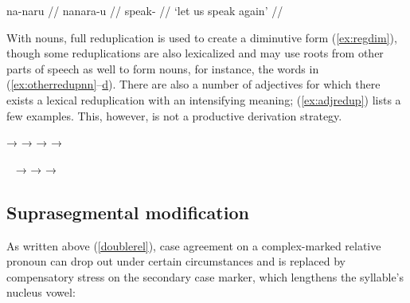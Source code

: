 \a\label{ex:hort+iter}\begingl
	\gla na-naru //
	\glb na\til{}nara-u //
	\glc \Iter{}\til{}speak-\Imp{} //
	\glft `let us speak again' //
\endgl

\xe

With nouns, full reduplication is used to create a diminutive 
form (\ref{ex:regdim}), though some reduplications are also lexicalized and 
may use roots from other parts of speech as well to form nouns, for instance, 
the words in (\ref{ex:otherredupnn}--\hyperref[ex:otherredupvb]{d}). There are 
also a number of adjectives for which there exists a lexical reduplication with 
an intensifying meaning; (\ref{ex:adjredup}) lists a few examples. This, 
however, is not a productive derivation strategy.

\pex
	\a {}
		→ \label{ex:regdim}
	\a {}
		→ %
			\label{ex:otherredupnn}
	\a {}
		→  
			\label{ex:otherredupadj}
	\a {} → 
			\label{ex:otherredupvb}
\xe

\pex~\label{ex:adjredup}
	\a {}
		→ 
	\a {}
		→ 
	\a {}
		→ 
\xe


\subsection{Suprasegmental modification}

As written above (\autoref{doublerel}), case agreement on a complex-marked 
relative pronoun can drop out under certain 
circumstances and is replaced by compensatory stress on the secondary case 
marker, which lengthens the syllable's nucleus vowel:

